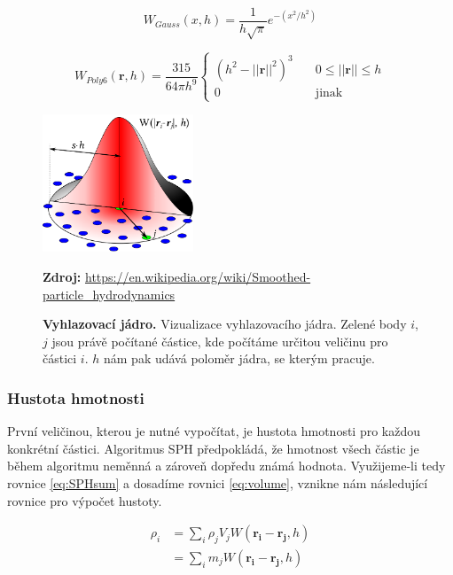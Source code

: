 \begin{equation}
     W_{Gauss}(x,h) = \frac{1}{h\sqrt{\pi}}e^{-(x^2/h^2)}
     \label{eq:1DGauss}
 \end{equation}
 
 \begin{equation}
     W_{Poly6}(\mathbf{r},h) = \frac{315}{64 \pi h^9}
     \begin{cases}
       (h^2 - ||\mathbf{r}||^2)^3    & \quad 0 \leq ||\mathbf{r}|| \leq h\\
       0                            & \quad \text{jinak}
     \end{cases}
     \label{eq:kernelPoly6}
 \end{equation}

\begin{figure}[hbt]
	\centering
	\captionsetup{justification=centering}
	\includegraphics[width=0.4\textwidth]{obrazky-figures/SPHInterpolationColorsVerbose.png}
	\caption{\textbf{Vyhlazovací jádro.} Vizualizace vyhlazovacího jádra. Zelené body $i$, $j$ jsou právě počítané částice, kde počítáme určitou veličinu pro částici $i$. $h$ nám pak udává poloměr jádra, se kterým pracuje.}
	\textbf{Zdroj: } \url{https://en.wikipedia.org/wiki/Smoothed-particle_hydrodynamics}
	\label{fig:Kernel}
\end{figure}

\subsubsection{Hustota hmotnosti}
První veličinou, kterou je nutné vypočítat, je hustota hmotnosti pro každou konkrétní částici. Algoritmus SPH předpokládá, že hmotnost všech částic je během algoritmu neměnná a zároveň dopředu známá hodnota. Využijeme-li tedy rovnice \ref{eq:SPHsum} a dosadíme rovnici \ref{eq:volume}, vznikne nám následující rovnice pro výpočet hustoty.


\begin{equation}
    \begin{split}
        \rho_i  & = \sum_i \rho_j V_j W(\mathbf{r_i} - \mathbf{r_j},h) \\
                & = \sum_i m_j W(\mathbf{r_i} - \mathbf{r_j},h)
    \end{split}
    \label{eq:MassDensity}
\end{equation}

